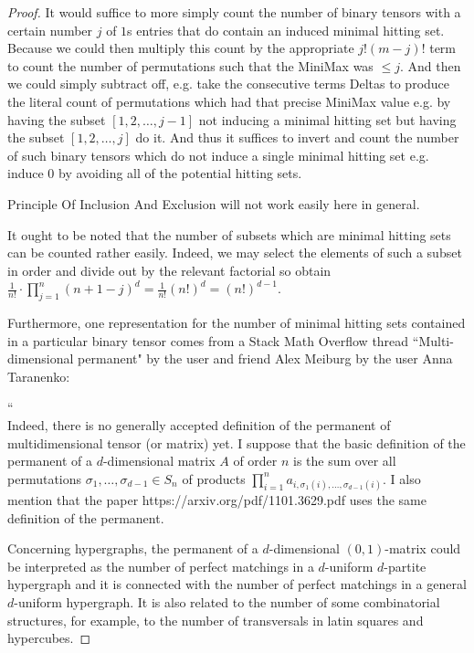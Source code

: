 \documentclass[12pt]{article}
\begin{document}
\begin{proof}
	It would suffice to more simply count the number of binary tensors with a certain number $j$ of $1$s entries that do contain an induced minimal hitting set. Because we could then multiply this count by the appropriate $j!(m-j)!$ term to count the number of permutations such that the MiniMax was $\le j$. And then we could simply subtract off, e.g. take the consecutive terms Deltas to produce the literal count of permutations which had that precise MiniMax value e.g. by having the subset $[1,2,\dots,j-1]$ not inducing a minimal hitting set but having the subset $[1,2,\dots,j]$ do it. And thus it suffices to invert and count the number of such binary tensors which do not induce a single minimal hitting set e.g. induce $0$ by avoiding all of the potential hitting sets.

	Principle Of Inclusion And Exclusion will not work easily here in general.

	It ought to be noted that the number of subsets which are minimal hitting sets can be counted rather easily. Indeed, we may select the elements of such a subset in order and divide out by the relevant factorial so obtain $\frac{1}{n!} \cdot \prod_{j=1}^{n} (n+1-j)^d = \frac{1}{n!} (n!)^d = (n!)^{d-1}$.

	Furthermore, one representation for the number of minimal hitting sets contained in a particular binary tensor comes from a Stack Math Overflow thread ``Multi-dimensional permanent" by the user and friend Alex Meiburg by the user Anna Taranenko:

	`` \\
	Indeed, there is no generally accepted definition of the permanent of multidimensional tensor (or matrix) yet. I suppose that the basic definition of the permanent of a $d$-dimensional matrix $A$ of order $n$ is the sum over all permutations $\sigma_1,\dots,\sigma_{d-1} \in S_n$ of products $\prod_{i=1}^{n} a_{i,\sigma_1(i),\dots,\sigma_{d-1}(i)}$. I also mention that the paper https://arxiv.org/pdf/1101.3629.pdf uses the same definition of the permanent.

	Concerning hypergraphs, the permanent of a $d$-dimensional $(0,1)$-matrix could be interpreted as the number of perfect matchings in a $d$-uniform $d$-partite hypergraph and it is connected with the number of perfect matchings in a general $d$-uniform hypergraph. It is also related to the number of some combinatorial structures, for example, to the number of transversals in latin squares and hypercubes.
	

\end{proof}
\end{document}
